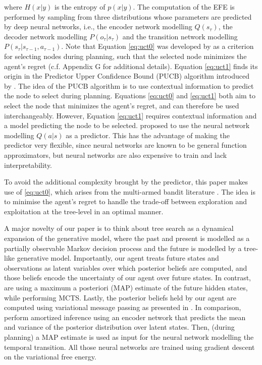 \documentclass[twoside,11pt]{article}
\begin{document}
where $H(x|y)$ is the entropy of $p(x|y)$. The computation of the EFE is performed by sampling from three distributions whose parameters are predicted by deep neural networks, i.e., the encoder network modelling $Q(s_\tau)$, the decoder network modelling $P(o_\tau|s_\tau)$ and the transition network modelling $P(s_\tau|s_{\tau-1},a_{\tau-1})$. Note that Equation \eqref{eq:uct0} was developed by \citet{DBLP:conf/ecml/KocsisS06} as a criterion for selecting nodes during planning, such that the selected node minimizes the agent's regret (c.f. Appendix G for additional details). Equation \eqref{eq:uct1} finds its origin in the Predictor Upper Confidence Bound (PUCB) algorithm introduced by \citet{PUCB}. The idea of the PUCB algorithm is to use contextual information to predict the node to select during planning. Equations \eqref{eq:uct0} and \eqref{eq:uct1} both aim to select the node that minimizes the agent's regret, and can therefore be used interchangeably. However, Equation \eqref{eq:uct1} requires contextual information and a model predicting the node to be selected. \citet{DeepAIwithMCMC} proposed to use the neural network modelling $Q(a|s)$ as a predictor. This has the advantage of making the predictor very flexible, since neural networks are known to be general function approximators, but neural networks are also expensive to train and lack interpretability.

To avoid the additional complexity brought by the predictor, this paper makes use of \eqref{eq:uct0}, which arises from the multi-armed bandit literature \citep{Auer2002}. The idea is to minimise the agent's regret to handle the trade-off between exploration and exploitation at the tree-level in an optimal manner.

A major novelty of our paper is to think about tree search as a dynamical expansion of the generative model, where the past and present is modelled as a partially observable Markov decision process \citep{POMDP_THESIS} and the future is modelled by a tree-like generative model. Importantly, our agent treats future states and observations as latent variables over which posterior beliefs are computed, and those beliefs encode the uncertainty of our agent over future states. In contrast, \citet{DeepAIwithMCMC} are using a maximum a posteriori (MAP) estimate of the future hidden states, while performing MCTS. Lastly, the posterior beliefs held by our agent are computed using variational message passing as presented in \citep{AI_VMP}. In comparison, \citet{DeepAIwithMCMC} perform amortized inference using an encoder network that predicts the mean and variance of the posterior distribution over latent states. Then, (during planning) a MAP estimate is used as input for the neural network modelling the temporal transition. All those neural networks are trained using gradient descent on the variational free energy.
\end{document}
